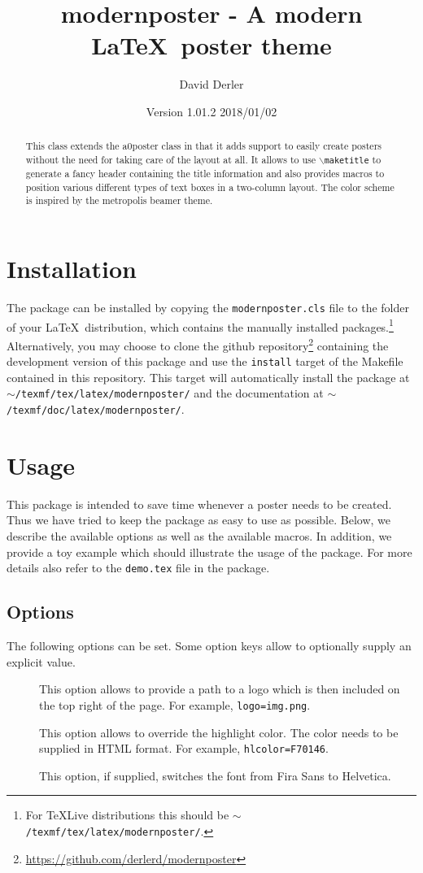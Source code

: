 \documentclass{article}
\title{modernposter - A modern \LaTeX~poster theme}
\author{David Derler}
\date{Version 1.01.2 2018/01/02}
\begin{document}
  \maketitle

  \begin{abstract}
\noindent This class extends the a0poster class in that it adds support to easily create posters without the need for taking care of the layout at all. It allows to use {\tt $\backslash$maketitle} to generate a fancy header containing the title information and also provides macros to position various different types of text boxes in a two-column layout. The color scheme  is inspired by the metropolis beamer theme.
  \end{abstract}
  \section{Installation}
  The package can be installed by copying the {\tt modernposter.cls} file to the folder of your \LaTeX~distribution, which contains the manually installed packages.\footnote{For TeXLive distributions this should be {\tt $\sim$/texmf/tex/latex/modernposter/}.} Alternatively, you may choose to clone the github repository\footnote{\url{https://github.com/derlerd/modernposter}} containing the development version of this package and use the {\tt install} target of the Makefile contained in this repository. This target will automatically install the package at {\tt $\sim$/texmf/tex/latex/modern\-poster/} and the documentation at {\tt $\sim$/texmf/doc/latex/modernposter/}.
  \section{Usage}
  This package is intended to save time whenever a poster needs to be created. Thus we have tried to keep the package as easy to use as possible. Below, we describe the available options as well as the available macros. In addition, we provide a toy example which should illustrate the usage of the package. For more details also refer to the {\tt demo.tex} file in the package.
  \subsection{Options}
  The following options can be set. Some option keys allow to optionally supply an explicit value.  
  \begin{description}
  	\item[] This option allows to provide a path to a logo which is then included on the top right of the page. For example, {\tt logo=img.png}.
  	\item[] This option allows to override the highlight color. The color needs to be supplied in HTML format. For example, {\tt hlcolor=F70146}. 
    \item[] This option, if supplied, switches the font from Fira Sans to Helvetica.
  \end{description}
\end{document}
